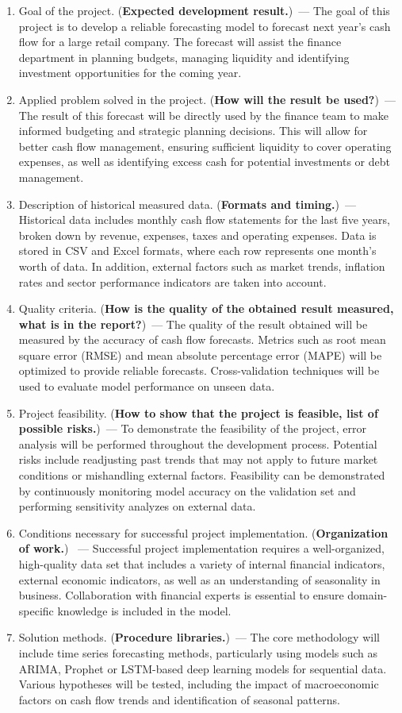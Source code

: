 \documentclass[12pt]{article}
\begin{document}
\begin{enumerate}
\item Goal of the project. (\textbf{Expected development result.})~---
The goal of this project is to develop a reliable forecasting model to forecast next year's cash flow for a large retail company. The forecast will assist the finance department in planning budgets, managing liquidity and identifying investment opportunities for the coming year.
\item Applied problem solved in the project. (\textbf{How will the result be used?})~--- The result of this forecast will be directly used by the finance team to make informed budgeting and strategic planning decisions. This will allow for better cash flow management, ensuring sufficient liquidity to cover operating expenses, as well as identifying excess cash for potential investments or debt management.
\item Description of historical measured data. (\textbf{Formats and timing.})~--- Historical data includes monthly cash flow statements for the last five years, broken down by revenue, expenses, taxes and operating expenses. Data is stored in CSV and Excel formats, where each row represents one month's worth of data. In addition, external factors such as market trends, inflation rates and sector performance indicators are taken into account.
\item Quality criteria. (\textbf{How is the quality of the obtained result measured, what is in the report?})~--- The quality of the result obtained will be measured by the accuracy of cash flow forecasts. Metrics such as root mean square error (RMSE) and mean absolute percentage error (MAPE) will be optimized to provide reliable forecasts. Cross-validation techniques will be used to evaluate model performance on unseen data.
\item Project feasibility. (\textbf{How to show that the project is feasible, list of possible risks.})~--- To demonstrate the feasibility of the project, error analysis will be performed throughout the development process. Potential risks include readjusting past trends that may not apply to future market conditions or mishandling external factors. Feasibility can be demonstrated by continuously monitoring model accuracy on the validation set and performing sensitivity analyzes on external data.
\item Conditions necessary for successful project implementation. (\textbf{Organization of work.}) ~--- Successful project implementation requires a well-organized, high-quality data set that includes a variety of internal financial indicators, external economic indicators, as well as an understanding of seasonality in business. Collaboration with financial experts is essential to ensure domain-specific knowledge is included in the model.
\item Solution methods. (\textbf{Procedure libraries.})~--- The core methodology will include time series forecasting methods, particularly using models such as ARIMA, Prophet or LSTM-based deep learning models for sequential data. Various hypotheses will be tested, including the impact of macroeconomic factors on cash flow trends and identification of seasonal patterns.
\end{enumerate}
\end{document}
